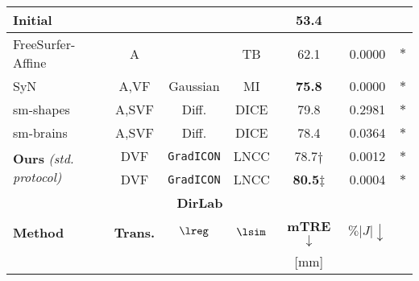 \begin{table*}[b]
\begin{small}
\begin{tabular}{lcccccc}
			Initial                                               &                         &                                       &             & 53.4\resTS                 &                                                      \\
			\midrule
			FreeSurfer-Affine~\cite{reuter2010highly}             & A                       & \textemdash                           & TB          & 62.1\resTS                 & 0.0000            & $\ast$                           \\
			SyN~\cite{avants2008symmetric}                        & A,VF                    & Gaussian                              & MI          & \bf{75.8}\resTS           & 0.0000            & $\ast$                           \\ \hline
			sm-shapes~\cite{hoffmann2022synthmorph}               & A,SVF                   & Diff.                                 & DICE        & 79.8\resTS                 & 0.2981            & $\ast$                           \\
			sm-brains~\cite{hoffmann2022synthmorph}               & A,SVF                   & Diff.                                 & DICE        & 78.4\resTS                 & 0.0364            & $\ast$                           \\
			\multirow{2}{*}{\textbf{Ours} \emph{(std. protocol)}} & DVF                     & \cellcolor{black!10}\texttt{GradICON} & LNCC        & 78.7$\dagger$              & 0.0012            & $\ast$                           \\
			                                                      & DVF                     & \cellcolor{black!10}\texttt{GradICON} & LNCC        & \bf{80.5}$\ddagger$        & 0.0004            & $\ast$                           \\
			\midrule
			\multicolumn{6}{c}{\bf DirLab}                                                                                                                                                                                            \\ \midrule
			\bf Method                                            & \bf Trans.              & $\lreg$                               & $\lsim$     & \textbf{mTRE} $\downarrow$ & $\%|J|\downarrow$                                    \\[-2pt]
			                                                      &                         &                                       &             & {\footnotesize [mm]}       &                                                      \\[-2pt]

\end{tabular}
\end{small}
\end{table*}
